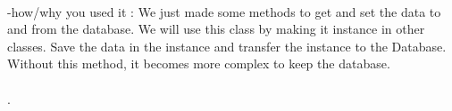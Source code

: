 \documentclass[conference]{IEEEtran}
\begin{document}
\\ -how/why you used it : We just made some methods to get and set the data to and from the database. We will use this class by making it instance in other classes. Save the data in the instance and transfer the instance to the Database. Without this method, it becomes more complex to keep the database.\\\\.\\\\\\\\\\\\\\\\\\\\\\\\\\\\\\\\\\\\\\\\\\\\\\\\\\\\\\\\\\\\\\\\\\\\\\\\\\\\\\\\\\\\\\\\\\\\\\\\\\\\\\\\\\\\\\\\\\\\\\\\\\\\\\\\\\\\\\\\\\\\\\\\\\\\\\\\\\\\\\\\\\\\\\\\\\\\\\\\\\\\\\

\section{Use Cases}

\begin{figure}[htbp]
\begin{center}
    \caption{Application Flowchart} 
\end{center}
\end{figure}



.\\\\\\\\\\\\\\\\\\\\\\\\\\\\\\\\\\\\\\\\\\\\\\\\\\\\\\\\\\\\\\\\\\\\\\\\\\\\\\\\\\\\\\\\\\\\\\\\\\\\\\\\\\\\\\\\\\\\\\\\\\\\\\\\\\

\begin{figure}[htbp]
\begin{center}
    \caption{Server Flowchart} 
\end{center}
\end{figure}

.\\\\\\\\\\\\\\\\\\\\\\\\\\\\\\\\\\\\\\\\\\\\\\\\\\\\\\\\\\\\\\\\\\\\\\\\\\\\\\\\\\\\\\\\\\\\\\\\\\\\\\\\\\\\\\\\\\\\\\\\\\\\\\\\\\
-1) BLE searching and push notice
\begin{figure}[htbp]
\begin{center}
    \caption{BLE searching and push notice} 
\end{center}
\end{figure}\\
\quad If User turn on the bluetooth module, smartphone finds the BLE signal, and then Server sends to notice that information data about Exhibition is downloaded. If user touch the push notice, then temporary activity is open.\\\\\\\\\\\

-2) Temporary Activity01 \\
\begin{figure}[htbp]
\begin{center}
    \caption{Temporary Activity 01} 
\end{center}
\end{figure}\\
\quad This is the page when temporary page 
\end{document}
